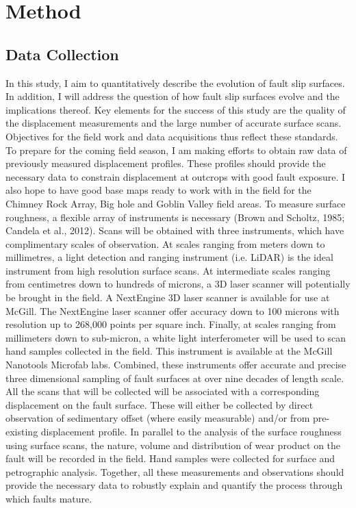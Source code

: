 \documentclass[12pt,a4paper]{article}
\begin{document}
\section{Method}

	\subsection{Data Collection}

In this study, I aim to quantitatively describe the evolution of fault slip surfaces. In addition, I will address the question of how fault slip surfaces evolve and the implications thereof. Key elements for the success of this study are the quality of the displacement measurements and the large number of accurate surface scans.  Objectives for the field work and data acquisitions thus reflect these standards. To prepare for the coming field season, I am making efforts to obtain raw data of previously measured displacement profiles. These profiles should provide the necessary data to constrain displacement at outcrops with good fault exposure. I also hope to have good base maps ready to work with in the field for the Chimney Rock Array, Big hole and Goblin Valley field areas. 
To measure surface roughness, a flexible array of instruments is necessary (Brown and Scholtz, 1985; Candela et al., 2012). Scans will be obtained with three instruments, which have complimentary scales of observation. At scales ranging from meters down to millimetres, a light detection and ranging instrument (i.e. LiDAR) is the ideal instrument from high resolution surface scans. At intermediate scales ranging from centimetres down to hundreds of microns, a 3D laser scanner will potentially be brought in the field. A NextEngine 3D laser scanner is available for use at McGill. The NextEngine laser scanner offer accuracy down to 100 microns with resolution up to 268,000 points per square inch. Finally, at scales ranging from millimeters down to sub-micron, a white light interferometer will be used to scan hand samples collected in the field. This instrument is available at the McGill Nanotools Microfab labs. Combined, these instruments offer accurate and precise three dimensional sampling of fault surfaces at over nine decades of length scale. All the scans that will be collected will be associated with a corresponding displacement on the fault surface. These will either be collected by direct observation of sedimentary offset (where easily measurable) and/or from pre-existing displacement profile.
In parallel to the analysis of the surface roughness using surface scans, the nature, volume and distribution of wear product on the fault will be recorded in the field. Hand samples were collected for surface and petrographic analysis. Together, all these measurements and observations should provide the necessary data to robustly explain and quantify the process through which faults mature.
\end{document}
